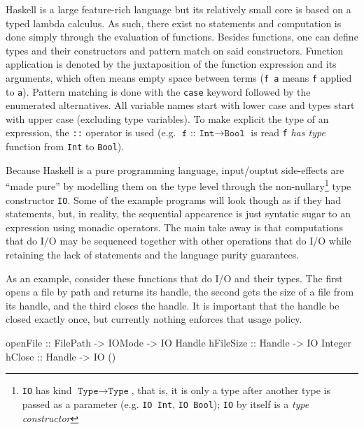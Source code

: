 \documentclass[]{lwnovathesis}
\begin{document}
Haskell is a large feature-rich language but its relatively small core is based
on a typed lambda calculus. As such, there exist no statements and computation
is done simply through the evaluation of functions. Besides functions, one can
define types and their constructors and pattern match on said constructors.
Function application is denoted by the juxtaposition of the function expression
and its arguments, which often means empty space between terms (\texttt{f~a}
means \texttt{f} applied to \texttt{a}). Pattern matching is done with the
\texttt{case} keyword followed by the enumerated alternatives. All variable
names start with lower case and types start with upper case (excluding type
variables). To make explicit the type of an expression, the \texttt{::} operator
is used (e.g.  $\texttt{f~::~Int}\to \texttt{Bool}$ is read \texttt{f} \emph{has
type} function from \texttt{Int} to \texttt{Bool}).

Because Haskell is a pure programming language, input/ouptut side-effects are
``made pure'' by modelling them on the type level through the
non-nullary\footnote{\texttt{IO} has kind $\texttt{Type}\to\texttt{Type}$,
that is, it is only a type after another type is passed as a parameter (e.g.
\texttt{IO~Int}, \texttt{IO~Bool}); \texttt{IO} by itself is a \emph{type
constructor}} type constructor \texttt{IO}.
Some of the example programs will look though as
if they had statements, but, in reality, the sequential appearence is just
syntatic sugar to an expression using monadic operators. The main take away is
that computations that do I/O may be sequenced together with other operations
that do I/O while retaining the lack of statements and the language purity
guarantees.


As an example, consider these functions that do I/O and their types. The first
opens a file by path and returns its handle, the second gets the size of a file
from its handle, and the third closes the handle. It is important that the
handle be closed exactly once, but currently nothing enforces that usage policy.

\begin{code}
openFile :: FilePath -> IOMode -> IO Handle
hFileSize :: Handle -> IO Integer
hClose   :: Handle -> IO ()
\end{code}
\end{document}
